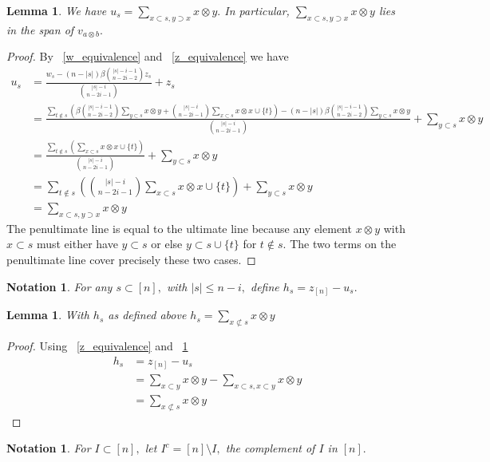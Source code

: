 \documentclass{amsart}
\newtheorem{lem}[subsubsection]{Lemma}
\newtheorem{note}[subsubsection]{Notation}
\begin{document}
\begin{lem}
\label{u_equivalence}
We have $u_s = \sum_{x\subset s,y\supset x}^{}x\otimes y.$ In particular, $\sum_{x\subset s,y\supset x}^{}x\otimes y$ lies in the span of $v_{a\otimes b}.$
\end{lem}
\begin{proof}
By ~\ref{w_equivalence} and ~\ref{z_equivalence} we have
\begin{align*}
	u_s &= \frac{w_s - (n - |s|)\beta \binom {|s|-i-1}{n-2i-2} z_s}{\binom {|s|-i}{n-2i-1}} + z_s\\
	&= \frac{\sum_{t\notin s}^{} \left(\beta \binom {|s|-i-1}{n-2i-2}\sum_{y \subset s}^{}x\otimes y + \binom {|s|-i}{n-2i-1}\sum_{x \subset s}^{}x \otimes x \cup \{t\} \right) - (n - |s|)\beta \binom {|s|-i-1}{n-2i-2} \sum_{y \subset s}^{}x\otimes y}{\binom {|s|-i}{n-2i-1}} + \sum_{y \subset s}^{}x\otimes y \\
	&=  \frac{\sum_{t\notin s}^{} \left(\sum_{x \subset s}^{}x \otimes x \cup \{t\} \right)}{\binom {|s|-i}{n-2i-1}} + \sum_{y \subset s}^{}x\otimes y \\
	&= \sum_{t\notin s}^{} \left(\binom {|s|-i}{n-2i-1}\sum_{x \subset s}^{}x \otimes x \cup \{t\} \right) + \sum_{y \subset s}^{}x\otimes y \\
	&=  \sum_{x\subset s,y\supset x}^{}x\otimes y
\end{align*}
The penultimate line is equal to the ultimate line because any element $x\otimes y$ with $x \subset s$ must either have $y \subset s$ or else $y \subset s \cup \{t\}$ for $t \notin s.$ The two terms on the penultimate line cover precisely these two cases.
\end{proof}

\begin{note}
For any $s \subset [n],$ with $|s| \leq n-i,$ define $h_s = z_{[n]} - u_s.$
\end{note}

\begin{lem}
\label{h_equivalence}
With $h_s$ as defined above $h_s = \sum_{x\not\subset s}^{}x\otimes y$
\end{lem}
\begin{proof}
Using ~\ref{z_equivalence} and ~\ref{u_equivalence}
\begin{align*}
	h_s &= z_{[n]} - u_s \\
	&= \sum_{x\subset y}^{}x\otimes y-\sum_{x\subset s,x\subset y}^{}x\otimes y\\
	&= \sum_{x\not\subset s}^{}x\otimes y
\end{align*}
\end{proof}
\begin{note}
For $I \subset[n],$ let $I^c = [n]\setminus I,$ the complement of $I$ in $[n].$
\end{note}
\end{document}
